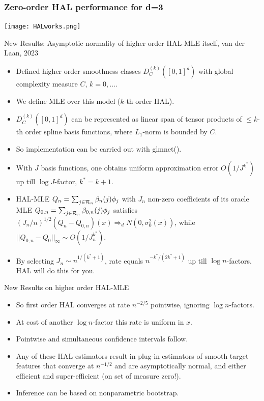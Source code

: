 \documentclass[t]{beamer}
\begin{document}
\begin{frame}
\frametitle{Zero-order HAL performance for d=3}
  \vspace{-10pt}
  \begin{center}
  \texttt{[image: HALworks.png]}
  \end{center}
\end{frame}

\begin{frame}{New Results: Asymptotic normality of higher order HAL-MLE itself, van der Laan, 2023}
\begin{itemize}
\item Defined higher order smoothness classes $D^{(k)}_C([0,1]^d)$ with global complexity measure $C$, $k=0,\ldots$.
\item We define MLE over this model ($k$-th order HAL).
\item $D^{(k)}_C([0,1]^d)$ can be represented as linear span of tensor products of $\leq k$-th order spline basis functions, where  $L_1$-norm is bounded by $C$.
\item So implementation can be carried out with glmnet().
\item With $J$ basis functions, one obtains uniform approximation error $O(1/J^{k^*})$ up till $\log J$-factor, $k^*=k+1$.
 \item HAL-MLE $Q_n=\sum_{j\in {\cal R}_n}\beta_n(j)\phi_j$ with $J_n$  non-zero coefficients of its oracle MLE  $Q_{0,n}=\sum_{j\in {\cal R}_n}\beta_{0,n}(j)\phi_j$ satisfies $(J_n/n)^{1/2}(Q_n-Q_{0,n})(x)\Rightarrow_d N(0,\sigma^2_0(x))$, while $|| Q_{0,n}-Q_0 ||_{\infty}\sim O(1/J_n^{k^*})$. 
\item By selecting $J_n\sim n^{1/(k^*+1)}$, rate equals $n^{-k^*/(2k^*+1)}$ up till $\log n$-factors. HAL will do this for you.
\end{itemize}
\end{frame}
\begin{frame}{New Results on higher order HAL-MLE}
\begin{itemize}
\item So first order HAL converges at rate $n^{-2/5}$ pointwise, ignoring $\log n$-factors. 
\item At cost of another $\log n$-factor this rate is uniform in $x$. 
\item Pointwise and simultaneous  confidence intervals follow.
\item Any of these HAL-estimators result in plug-in estimators of smooth target features that converge at $n^{-1/2}$ and are asymptotically normal, and either efficient and super-efficient (on set of measure zero!).
\item Inference can be based on nonparametric bootstrap.
\end{itemize}

\end{frame}
\end{document}
